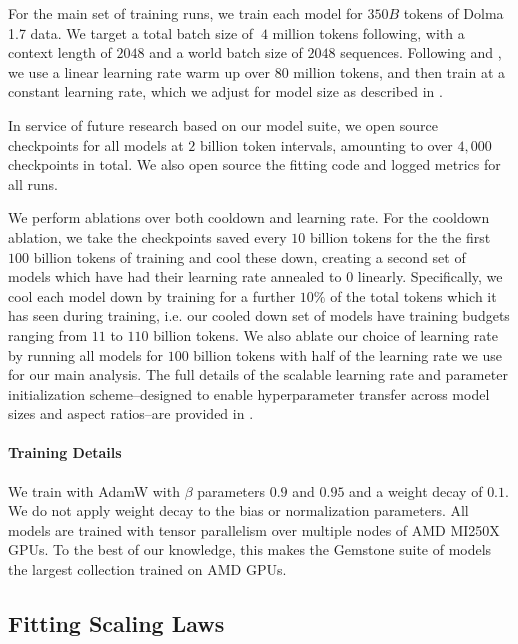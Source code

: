\documentclass{article}
\begin{document}
For the main set of training runs, we train each model for \(350B\) tokens of Dolma 1.7 \citep{dolma} data.
We target a total batch size of \(~4\) million tokens following\citep{touvron2023llama2, dubey2024llama, bai2023qwen}, with a context length of \(2048\) and a world batch size of $2048$ sequences. 
Following \citet{hagele2024scaling} and \citet{hu2024minicpm}, we use a linear learning rate warm up over \(80\) million tokens, and then train at a constant learning rate, which we adjust for model size as described in .

In service of future research based on our model suite, we open source checkpoints for all models at \(2\) billion token intervals, amounting to over \(4,000\) checkpoints in total. 
We also open source the fitting code and logged metrics for all runs.

We perform ablations over both cooldown and learning rate. 
For the cooldown ablation, we take the checkpoints saved every \(10\) billion tokens for the the first \(100\) billion tokens of training and cool these down, creating a second set of models which have had their learning rate annealed to \(0\) linearly.
Specifically, we cool each model down by training for a further \(10\%\) of the total tokens which it has seen during training, i.e. our cooled down set of models have training budgets ranging from \(11\) to \(110\) billion tokens.
We also ablate our choice of learning rate by running all models for \(100\) billion tokens with half of the learning rate we use for our main analysis.
The full details of the scalable learning rate and parameter initialization scheme--designed to enable hyperparameter transfer across model sizes and aspect ratios--are provided in .

\paragraph{Training Details}

We train with AdamW \citep{loshchilov2017decoupled} with \(\beta\) parameters \(0.9\) and \(0.95\) and a weight decay of \(0.1\). We do not apply weight decay to the bias or normalization parameters. All models are trained with tensor parallelism \citep{singh2024axonn,singh2024hybrid} over multiple nodes of AMD MI250X GPUs. To the best of our knowledge, this makes the Gemstone suite of models the largest collection trained on AMD GPUs. 

\subsection{Fitting Scaling Laws}\label{subsec:fitting-scaling-laws}
\end{document}
